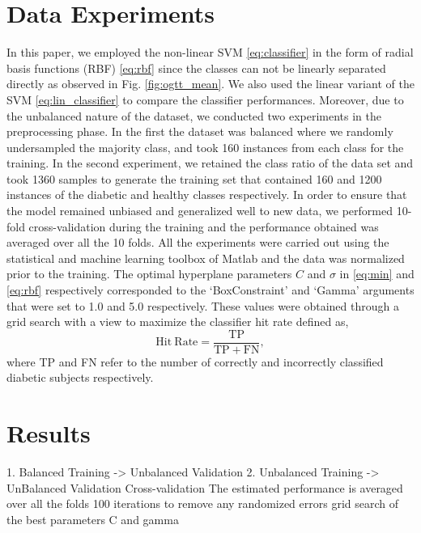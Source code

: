 \documentclass[journal,comsoc]{IEEEtran}
\renewcommand{\^}{\hat}  %
\begin{document}
\section{Data Experiments}
%
In this paper, we employed the non-linear SVM \eqref{eq:classifier} in the form of radial basis functions (RBF) \eqref{eq:rbf} since the classes can not be linearly separated directly as observed in Fig. \ref{fig:ogtt_mean}. We also used the linear variant of the SVM \eqref{eq:lin_classifier} to compare the classifier performances. Moreover, due to the unbalanced nature of the dataset, we conducted two experiments in the preprocessing phase. In the first the dataset was balanced where we randomly undersampled the majority class, and  took \num{160} instances from each class for the training. In the second experiment, we retained the class ratio of the data set and took \num[group-minimum-digits=4, group-separator = {,}]{1360} samples to generate the training set that contained \num{160} and \num[group-minimum-digits=4, group-separator = {,}]{1200} instances of the diabetic and healthy classes respectively. In order to ensure that the model remained unbiased and generalized well to new data, we performed \num{10}-fold cross-validation during the training and the performance obtained was averaged over all the \num{10} folds. All the experiments were carried out using the statistical and machine learning toolbox of Matlab and the data was normalized prior to the training. The optimal hyperplane parameters $C$ and $\sigma$ in \eqref{eq:min} and \eqref{eq:rbf} respectively corresponded to the `BoxConstraint' and `Gamma' arguments that were set to \num{1.0} and \num{5.0} respectively. These values were obtained through a grid search with a view to maximize the classifier hit rate defined as,
%
\begin{equation}
  \mathrm{Hit~Rate} = \frac{\mathrm{TP}}{\mathrm{TP} + \mathrm{FN}},
\end{equation}
%
where TP and FN refer to the number of correctly and incorrectly classified diabetic subjects respectively.
%
%
%
\section{Results}
%
%





1. Balanced Training -> Unbalanced Validation
2. Unbalanced Training -> UnBalanced Validation
%
Cross-validation
The estimated performance is averaged over all the folds
100 iterations to remove any randomized errors
grid search of the best parameters C and gamma
%
\end{document}

